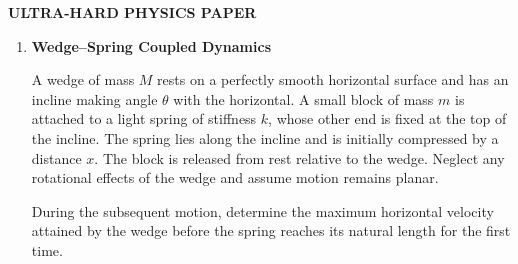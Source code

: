 \documentclass[12pt]{article}
\begin{document}
\begin{center}
\Large \textbf{ULTRA-HARD PHYSICS PAPER}
\end{center}

\begin{enumerate}

\item \textbf{Wedge–Spring Coupled Dynamics}


A wedge of mass $M$ rests on a perfectly smooth horizontal surface and has an incline making angle $\theta$ with the horizontal. A small block of mass $m$ is attached to a light spring of stiffness $k$, whose other end is fixed at the top of the incline. The spring lies along the incline and is initially compressed by a distance $x$. The block is released from rest relative to the wedge. Neglect any rotational effects of the wedge and assume motion remains planar.

During the subsequent motion, determine the maximum horizontal velocity attained by the wedge before the spring reaches its natural length for the first time.

\begin{center}
\end{center}


\end{enumerate}
\end{document}
